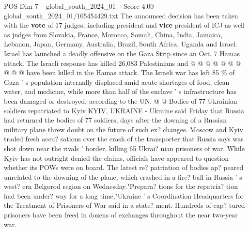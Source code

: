 \begin{textsample}{POS Dim 7 – global\_south\_2024\_01 – Score 4.00 – global\_south\_2024\_01/105454429.txt}
The announced decision has been taken with the \textbf{vote} of 17 judges, including president and \textbf{vice} president of ICJ as well as judges from Slovakia, France, Morocco, Somali, China, India, Jamaica, Lebanon, Japan, Germany, Australia, Brazil, South Africa, Uganda and Israel.
Israel has launched a deadly offensive on the Gaza Strip since an Oct. 7 Hamas attack.
The Israeli response has killed 26,083 Palestinians and @ @ @ @ @ @ @ @ @ @ have been killed in the Hamas attack.
The Israeli war has left 85 \% of Gaza ' s population internally displaced amid acute shortages of food, clean water, and medicine, while more than half of the enclave ' s infrastructure has been damaged or destroyed, according to the UN. @ @ Bodies of 77 Ukrainian soldiers repatriated to Kyiv KYIV, UKRAINE - Ukraine said Friday that Russia had returned the bodies of 77 soldiers, days after the downing of a Russian military plane threw doubt on the future of such ex? changes.
Moscow and Kyiv traded fresh accu? sations over the crash of the transporter that Russia says was shot down near the rivals ' border, killing 65 Ukrai? nian prisoners of war.
While Kyiv has not outright denied the claims, officials have appeared to question whether its POWs were on board.
The latest re? patriation of bodies ap? peared unrelated to the downing of the plane, which crashed in a fire? ball in Russia ' s west? ern Belgorod region on Wednesday."Prepara? tions for the repatria? tion had been under? way for a long time,"Ukraine ' s Coordination Headquarters for the Treatment of Prisoners of War said in a state? ment.
Hundreds of cap? tured prisoners have been freed in dozens of exchanges throughout the near two-year war.

\end{textsample}
